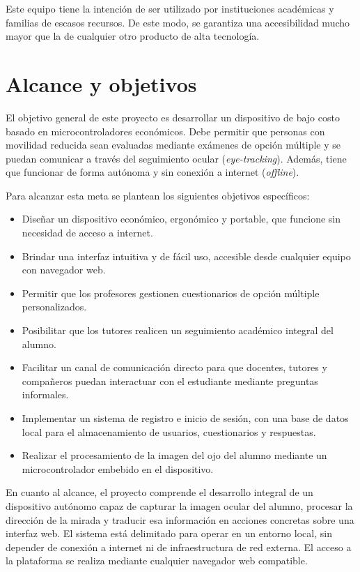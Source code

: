 Este equipo tiene la intención de ser utilizado por instituciones académicas y familias de escasos recursos. De este modo, se garantiza una accesibilidad mucho mayor que la de cualquier otro producto de alta tecnología.


\section{Alcance y objetivos}
\label{sec:alcance}

El objetivo general de este proyecto es desarrollar un dispositivo de bajo costo basado en microcontroladores económicos. Debe permitir que personas con movilidad reducida sean evaluadas mediante exámenes de opción múltiple y se puedan comunicar a través del seguimiento ocular (\emph{eye-tracking}). Además, tiene que funcionar de forma autónoma y sin conexión a internet (\emph{offline}).

Para alcanzar esta meta se plantean los siguientes objetivos específicos:

\begin{itemize}
    \item Diseñar un dispositivo económico, ergonómico y portable, que funcione sin necesidad de acceso a internet.
    \item Brindar una interfaz intuitiva y de fácil uso, accesible desde cualquier equipo con navegador web.
    \item Permitir que los profesores gestionen cuestionarios de opción múltiple personalizados.
    \item Posibilitar que los tutores realicen un seguimiento académico integral del alumno.
    \item Facilitar un canal de comunicación directo para que docentes, tutores y compañeros puedan interactuar con el estudiante mediante preguntas informales.
    \item Implementar un sistema de registro e inicio de sesión, con una base de datos local para el almacenamiento de usuarios, cuestionarios y respuestas.
    \item Realizar el procesamiento de la imagen del ojo del alumno mediante un microcontrolador embebido en el dispositivo.
\end{itemize}

En cuanto al alcance, el proyecto comprende el desarrollo integral de un dispositivo autónomo capaz de capturar la imagen ocular del alumno, procesar la dirección de la mirada y traducir esa información en acciones concretas sobre una interfaz web. El sistema está delimitado para operar en un entorno local, sin depender de conexión a internet ni de infraestructura de red externa. El acceso a la plataforma se realiza mediante cualquier navegador web compatible.

